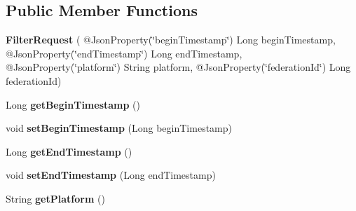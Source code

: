 \subsection*{Public Member Functions}
\begin{DoxyCompactItemize}
\item 
\mbox{\label{classeu_1_1h2020_1_1symbiote_1_1barteringAndTrading_1_1FilterRequest_a6087c5aeecb57b32bf4b0c5de7fa1bde}} 
{\bfseries Filter\+Request} ( @Json\+Property(\char`\"{}begin\+Timestamp\char`\"{}) Long begin\+Timestamp, @Json\+Property(\char`\"{}end\+Timestamp\char`\"{}) Long end\+Timestamp, @Json\+Property(\char`\"{}platform\char`\"{}) String platform, @Json\+Property(\char`\"{}federation\+Id\char`\"{}) Long federation\+Id)
\item 
\mbox{\label{classeu_1_1h2020_1_1symbiote_1_1barteringAndTrading_1_1FilterRequest_a9a1489bfe85ce317c46bf964a6aa1a20}} 
Long {\bfseries get\+Begin\+Timestamp} ()
\item 
\mbox{\label{classeu_1_1h2020_1_1symbiote_1_1barteringAndTrading_1_1FilterRequest_a3e766ea1909bcd970460b4c987217769}} 
void {\bfseries set\+Begin\+Timestamp} (Long begin\+Timestamp)
\item 
\mbox{\label{classeu_1_1h2020_1_1symbiote_1_1barteringAndTrading_1_1FilterRequest_ad32ab1e605d991bb87f64d6fbeee6668}} 
Long {\bfseries get\+End\+Timestamp} ()
\item 
\mbox{\label{classeu_1_1h2020_1_1symbiote_1_1barteringAndTrading_1_1FilterRequest_afa2257382cbfbab02bd8d0460afdd803}} 
void {\bfseries set\+End\+Timestamp} (Long end\+Timestamp)
\item 
\mbox{\label{classeu_1_1h2020_1_1symbiote_1_1barteringAndTrading_1_1FilterRequest_aab2fcc98ce734584df16540499edb41f}} 
String {\bfseries get\+Platform} ()
\item 
\mbox{\label{classeu_1_1h2020_1_1symbiote_1_1barteringAndTrading_1_1FilterRequest_a8f4f41beb1104e264e029f775bf58336}} 

\end{DoxyCompactItemize}
